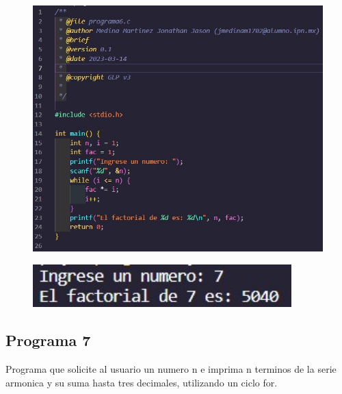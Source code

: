 \documentclass{article}
\begin{document}
\begin{figure}[H]
    \centering
    \includegraphics[width = 15cm]{img6a.jpg}
\end{figure}
\begin{figure}[H]
    \centering
    \includegraphics[width = 10cm]{img6b.jpg}
\end{figure}
\newpage
\subsection{Programa 7}

Programa que solicite al usuario un numero n e imprima n terminos de la serie
armonica y su suma hasta tres decimales, utilizando un ciclo for.
\end{document}
